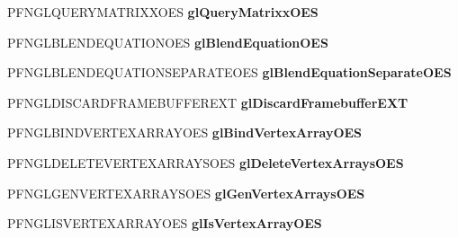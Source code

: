 \begin{DoxyCompactItemize}
\item 
\hypertarget{class_c_p_v_r_tgles_ext_a0ce82b62bb16f027ad6d201b632f9fec}{P\+F\+N\+G\+L\+Q\+U\+E\+R\+Y\+M\+A\+T\+R\+I\+X\+X\+O\+E\+S {\bfseries gl\+Query\+Matrixx\+O\+E\+S}}\label{class_c_p_v_r_tgles_ext_a0ce82b62bb16f027ad6d201b632f9fec}

\item 
\hypertarget{class_c_p_v_r_tgles_ext_a524e594ad0d7ecf4bca0f2165dde1c17}{P\+F\+N\+G\+L\+B\+L\+E\+N\+D\+E\+Q\+U\+A\+T\+I\+O\+N\+O\+E\+S {\bfseries gl\+Blend\+Equation\+O\+E\+S}}\label{class_c_p_v_r_tgles_ext_a524e594ad0d7ecf4bca0f2165dde1c17}

\item 
\hypertarget{class_c_p_v_r_tgles_ext_aebde1bb8206fab4b45005bda8230bb33}{P\+F\+N\+G\+L\+B\+L\+E\+N\+D\+E\+Q\+U\+A\+T\+I\+O\+N\+S\+E\+P\+A\+R\+A\+T\+E\+O\+E\+S {\bfseries gl\+Blend\+Equation\+Separate\+O\+E\+S}}\label{class_c_p_v_r_tgles_ext_aebde1bb8206fab4b45005bda8230bb33}

\item 
\hypertarget{class_c_p_v_r_tgles_ext_aeba9a509f536a0d6d724980033709779}{P\+F\+N\+G\+L\+D\+I\+S\+C\+A\+R\+D\+F\+R\+A\+M\+E\+B\+U\+F\+F\+E\+R\+E\+X\+T {\bfseries gl\+Discard\+Framebuffer\+E\+X\+T}}\label{class_c_p_v_r_tgles_ext_aeba9a509f536a0d6d724980033709779}

\item 
\hypertarget{class_c_p_v_r_tgles_ext_a094ddfc425aae87c0a156bbe26c3542f}{P\+F\+N\+G\+L\+B\+I\+N\+D\+V\+E\+R\+T\+E\+X\+A\+R\+R\+A\+Y\+O\+E\+S {\bfseries gl\+Bind\+Vertex\+Array\+O\+E\+S}}\label{class_c_p_v_r_tgles_ext_a094ddfc425aae87c0a156bbe26c3542f}

\item 
\hypertarget{class_c_p_v_r_tgles_ext_a2cdfb34035814a5cfa8129e5b47d25ef}{P\+F\+N\+G\+L\+D\+E\+L\+E\+T\+E\+V\+E\+R\+T\+E\+X\+A\+R\+R\+A\+Y\+S\+O\+E\+S {\bfseries gl\+Delete\+Vertex\+Arrays\+O\+E\+S}}\label{class_c_p_v_r_tgles_ext_a2cdfb34035814a5cfa8129e5b47d25ef}

\item 
\hypertarget{class_c_p_v_r_tgles_ext_a4218223c1146b02055e3625612bedbb3}{P\+F\+N\+G\+L\+G\+E\+N\+V\+E\+R\+T\+E\+X\+A\+R\+R\+A\+Y\+S\+O\+E\+S {\bfseries gl\+Gen\+Vertex\+Arrays\+O\+E\+S}}\label{class_c_p_v_r_tgles_ext_a4218223c1146b02055e3625612bedbb3}

\item 
\hypertarget{class_c_p_v_r_tgles_ext_a5783f689a6c21903140f1ad50a09c5d2}{P\+F\+N\+G\+L\+I\+S\+V\+E\+R\+T\+E\+X\+A\+R\+R\+A\+Y\+O\+E\+S {\bfseries gl\+Is\+Vertex\+Array\+O\+E\+S}}\label{class_c_p_v_r_tgles_ext_a5783f689a6c21903140f1ad50a09c5d2}

\end{DoxyCompactItemize}


